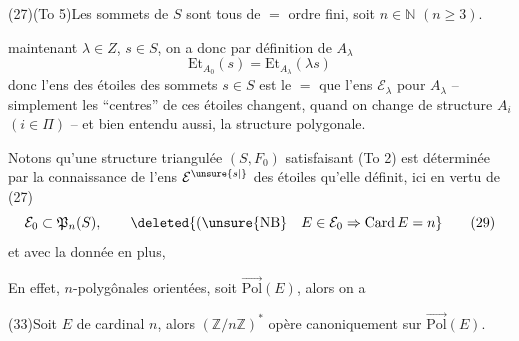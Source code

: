 (27)\qquad (To 5)\qquad Les sommets de $S$ sont tous de $=$ ordre fini, soit $n\in\mathbb N$ $(n\geqslant3)$.

 maintenant $\lambda\in Z$, $s\in S$, on a donc par définition de $A_\lambda$
\[
\mathrm{Et}_{A_0}(s)=\mathrm{Et}_{A_\lambda}(\lambda s)\tag*{(28)}
\]
donc l'ens  des étoiles des  sommets $s\in S$ est le $=$ que l'ens $\mathcal E_\lambda$ pour $A_\lambda$ -- simplement les ``centres'' de ces étoiles changent, quand on change de structure $A_i$ $(i\in\Pi)$ -- et bien entendu aussi, la structure polygonale.

Notons qu'une structure triangulée $(S,F_0)$ satisfaisant  (To 2) est déterminée par la connaissance de l'ens $\mathcal E^{\unsure{s|{}}}$ des étoiles qu'elle définit, ici en vertu de (27)
\[
\mathcal E_0\subset\mathfrak P_n(S),\qquad \deleted{(\unsure{\mathrm{NB}}\quad E\in\mathcal E_0\Rightarrow\mathrm{Card}\,E=n}\tag*{(29)}
\]
et avec la donnée en plus,  


En effet,   $n$-polygônales orientées, soit $\overrightarrow{\mathrm{Pol}}(E)$, alors on a

(33)\qquad Soit $E$ de cardinal $n$, alors $(\mathbb Z/n\mathbb Z)^*$ opère canoniquement sur $\overrightarrow{\mathrm{Pol}}(E)$.

